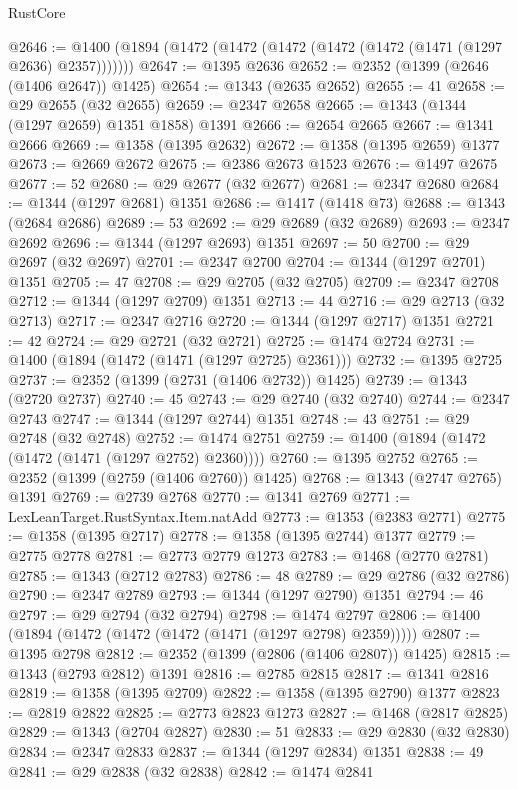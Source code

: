 \begin{lexlean}{RustCore}
\begin{coremodule}
@2646 := @1400 (@1894 (@1472 (@1472 (@1472 (@1472 (@1472 (@1471 (@1297 @2636) @2357)))))))
@2647 := @1395 @2636
@2652 := @2352 (@1399 (@2646 (@1406 @2647)) @1425)
@2654 := @1343 (@2635 @2652)
@2655 := 41
@2658 := @29 @2655 (@32 @2655)
@2659 := @2347 @2658
@2665 := @1343 (@1344 (@1297 @2659) @1351 @1858) @1391
@2666 := @2654 @2665
@2667 := @1341 @2666
@2669 := @1358 (@1395 @2632)
@2672 := @1358 (@1395 @2659) @1377
@2673 := @2669 @2672
@2675 := @2386 @2673 @1523
@2676 := @1497 @2675
@2677 := 52
@2680 := @29 @2677 (@32 @2677)
@2681 := @2347 @2680
@2684 := @1344 (@1297 @2681) @1351
@2686 := @1417 (@1418 @73)
@2688 := @1343 (@2684 @2686)
@2689 := 53
@2692 := @29 @2689 (@32 @2689)
@2693 := @2347 @2692
@2696 := @1344 (@1297 @2693) @1351
@2697 := 50
@2700 := @29 @2697 (@32 @2697)
@2701 := @2347 @2700
@2704 := @1344 (@1297 @2701) @1351
@2705 := 47
@2708 := @29 @2705 (@32 @2705)
@2709 := @2347 @2708
@2712 := @1344 (@1297 @2709) @1351
@2713 := 44
@2716 := @29 @2713 (@32 @2713)
@2717 := @2347 @2716
@2720 := @1344 (@1297 @2717) @1351
@2721 := 42
@2724 := @29 @2721 (@32 @2721)
@2725 := @1474 @2724
@2731 := @1400 (@1894 (@1472 (@1471 (@1297 @2725) @2361)))
@2732 := @1395 @2725
@2737 := @2352 (@1399 (@2731 (@1406 @2732)) @1425)
@2739 := @1343 (@2720 @2737)
@2740 := 45
@2743 := @29 @2740 (@32 @2740)
@2744 := @2347 @2743
@2747 := @1344 (@1297 @2744) @1351
@2748 := 43
@2751 := @29 @2748 (@32 @2748)
@2752 := @1474 @2751
@2759 := @1400 (@1894 (@1472 (@1472 (@1471 (@1297 @2752) @2360))))
@2760 := @1395 @2752
@2765 := @2352 (@1399 (@2759 (@1406 @2760)) @1425)
@2768 := @1343 (@2747 @2765) @1391
@2769 := @2739 @2768
@2770 := @1341 @2769
@2771 := LexLeanTarget.RustSyntax.Item.natAdd
@2773 := @1353 (@2383 @2771)
@2775 := @1358 (@1395 @2717)
@2778 := @1358 (@1395 @2744) @1377
@2779 := @2775 @2778
@2781 := @2773 @2779 @1273
@2783 := @1468 (@2770 @2781)
@2785 := @1343 (@2712 @2783)
@2786 := 48
@2789 := @29 @2786 (@32 @2786)
@2790 := @2347 @2789
@2793 := @1344 (@1297 @2790) @1351
@2794 := 46
@2797 := @29 @2794 (@32 @2794)
@2798 := @1474 @2797
@2806 := @1400 (@1894 (@1472 (@1472 (@1472 (@1471 (@1297 @2798) @2359)))))
@2807 := @1395 @2798
@2812 := @2352 (@1399 (@2806 (@1406 @2807)) @1425)
@2815 := @1343 (@2793 @2812) @1391
@2816 := @2785 @2815
@2817 := @1341 @2816
@2819 := @1358 (@1395 @2709)
@2822 := @1358 (@1395 @2790) @1377
@2823 := @2819 @2822
@2825 := @2773 @2823 @1273
@2827 := @1468 (@2817 @2825)
@2829 := @1343 (@2704 @2827)
@2830 := 51
@2833 := @29 @2830 (@32 @2830)
@2834 := @2347 @2833
@2837 := @1344 (@1297 @2834) @1351
@2838 := 49
@2841 := @29 @2838 (@32 @2838)
@2842 := @1474 @2841

\end{coremodule}
\end{lexlean}
